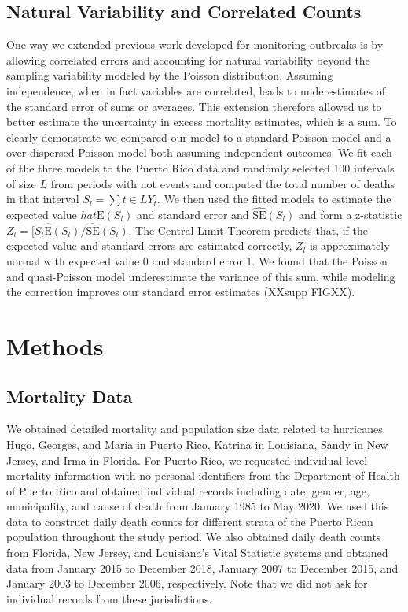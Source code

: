 \documentclass[11pt]{article}
\begin{document}
\subsection{Natural Variability and Correlated Counts}
\label{subsec:natural-variability}
One way we extended previous work developed for monitoring outbreaks \cite{farrington1996statistical,hohle2008count,noufaily2013improved,salmon2016monitoring} is by allowing correlated errors and accounting for natural variability beyond the sampling variability modeled by the Poisson distribution. Assuming independence, when in fact variables are correlated, leads to underestimates of the standard error of sums or averages. This extension therefore allowed us to better estimate the uncertainty in excess mortality estimates, which is a sum. To clearly demonstrate we compared our model to a standard Poisson model and a over-dispersed Poisson model both assuming independent outcomes. We fit each of the three models to the Puerto Rico data and randomly selected 100 intervals of size $L$ from periods with not events and computed the total number of deaths in that interval $S_l = \sum{t \in L} Y_t$. We then used the fitted models to estimate the expected value $hat{\mbox{E}}(S_l)$ and standard error  and $\hat{\mbox{SE}}(S_l)$ and form a z-statistic $Z_l = [S_l \hat{\mbox{E}}(S_l)/\hat{\mbox{SE}}(S_l)$. The Central Limit Theorem predicts that, if the expected value and standard errors are estimated correctly, $Z_l$ is approximately normal with expected value 0 and standard error 1. We found that the Poisson and quasi-Poisson model underestimate the variance of this sum, while modeling the correction improves our standard error estimates (XXsupp FIGXX). 

\section{Methods}
\label{sec:methods}

\subsection{Mortality Data}
\label{subsec:mortality-data}
We obtained detailed mortality and population size data related to hurricanes Hugo, Georges, and Mar\'ia in Puerto Rico, Katrina in Louisiana, Sandy in New Jersey, and Irma in Florida. For Puerto Rico, we requested individual level mortality information with no personal identifiers from the Department of Health of Puerto Rico and obtained individual records including date, gender, age, municipality, and cause of death from January 1985 to May 2020. We used this data to construct daily death counts for different strata of the Puerto Rican population throughout the study period. We also obtained daily death counts from Florida, New Jersey, and Louisiana’s Vital Statistic systems and obtained data from January 2015 to December 2018, January 2007 to December 2015, and January 2003 to December 2006, respectively. Note that we did not ask for individual records from these jurisdictions.
\end{document}
